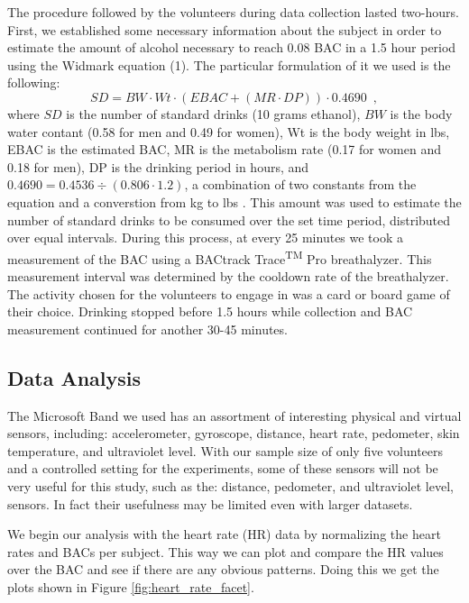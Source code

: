 The procedure followed by the volunteers during data collection lasted two-hours. First, we established some necessary information about the subject in order to estimate the amount of alcohol necessary to reach 0.08 BAC in a 1.5 hour period using the Widmark equation (1). The particular formulation of it we used is the following: \begin{equation}
SD =  BW \cdot Wt \cdot (EBAC + (MR \cdot DP)) \cdot 0.4690 \enspace ,
\end{equation} where $SD$ is the number of standard drinks (10 grams ethanol), $BW$ is the body water contant (0.58 for men and 0.49 for women), Wt is the body weight in lbs, EBAC is the estimated BAC, MR is the metabolism rate (0.17 for women and 0.18 for men), DP is the drinking period in hours, and  $0.4690 = 0.4536 \div (0.806 \cdot 1.2)$, a combination of two constants from the equation and a converstion from kg to lbs \cite{Andersson:2009}\cite{Wiki:BAC}. This amount was used to estimate the number of standard drinks to be consumed over the set time period, distributed over equal intervals. During this process, at every 25 minutes we took a measurement of the BAC using a BACtrack Trace\textsuperscript{TM} Pro breathalyzer. This measurement interval was determined by the cooldown rate of the breathalyzer. The activity chosen for the volunteers to engage in was a card or board game of their choice. Drinking stopped before 1.5 hours while collection and BAC measurement continued for another 30-45 minutes.

\subsection{Data Analysis}

The Microsoft Band we used has an assortment of interesting physical and virtual sensors, including: accelerometer, gyroscope, distance, heart rate, pedometer, skin temperature, and ultraviolet level. With our sample size of only five volunteers and a controlled setting for the experiments, some of these sensors will not be very useful for this study, such as the: distance, pedometer, and ultraviolet level, sensors. In fact their usefulness may be limited even with larger datasets. 

We begin our analysis with the heart rate (HR) data by normalizing the heart rates and BACs per subject. This way we can plot and compare the HR values over the BAC and see if there are any obvious patterns. Doing this we get the plots shown in Figure \ref{fig:heart_rate_facet}.

